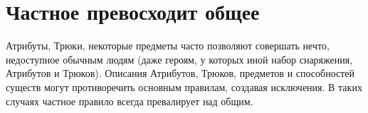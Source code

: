 \section{Частное превосходит общее}
Атрибуты, Трюки, некоторые предметы часто позволяют совершать нечто, недоступное обычным людям (даже героям, у которых иной набор снаряжения, Атрибутов и Трюков). Описания Атрибутов, Трюков, предметов и способностей существ могут противоречить основным правилам, создавая исключения. В таких случаях частное правило всегда превалирует над общим.